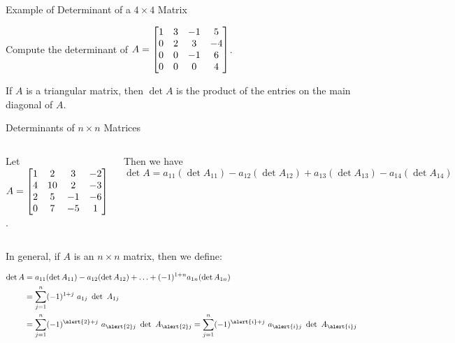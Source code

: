 \documentclass[xcolor=dvipsnames,aspectratio=169,t]{beamer}
\begin{document}
\begin{frame}{Example of Determinant of a $4 \times 4$ Matrix}
\bigskip

Compute the determinant of $\displaystyle A = \begin{bmatrix} 1 & 3 & -1 & 5\\0 & 2 & 3 &-4\\0 & 0 & -1 & 6\\ 0 & 0 & 0 & 4 \end{bmatrix}$. 

\vspace{2.5em}

\pause
\begin{theorem}
If $A$ is a \alert{triangular matrix}, then $\det A$ is the product of the entries on the main diagonal of $A$.
\end{theorem}
\end{frame}

\begin{frame}{Determinants of $n \times n$ Matrices}

{\small
\begin{columns}

\column{0.3\tw}

Let $\displaystyle A = \begin{bmatrix} 1  & 2 & 3 & -2\\ 4 & 10 & 2 & -3 \\ 2 & 5 & -1 & -6\\ 0 & 7 & -5 & 1 \end{bmatrix}$. 

\column{0.7\tw}
Then we have  $\det A = a_{11} (\det A_{11} ) - a_{12}( \det A_{12}) + a_{13}( \det A_{13}) - a_{14}( \det A_{14})$

\end{columns}}

\bbox
In general, if $A$ is an $n \times n$ matrix, then we define:

\vspace{-0.25in}
\begin{align*}
\det A &= a_{11} (\det A_{11} ) - a_{12} (\det A_{12} )+ \ldots + (-1)^{1+n}a_{1n} (\det A_{1n} )\\
&= \sum_{j=1}^n (-1)^{1+j} \ a_{1j} \ \det \ A_{1j} \\
&= \sum_{j=1}^n (-1)^{\alert{2}+j} \ a_{\alert{2}j} \ \det \ A_{\alert{2}j} = \sum_{j=1}^n (-1)^{\alert{i}+j} \ a_{\alert{i}j} \ \det \ A_{\alert{i}j}
\end{align*}
\ebox


\end{frame}
\end{document}
